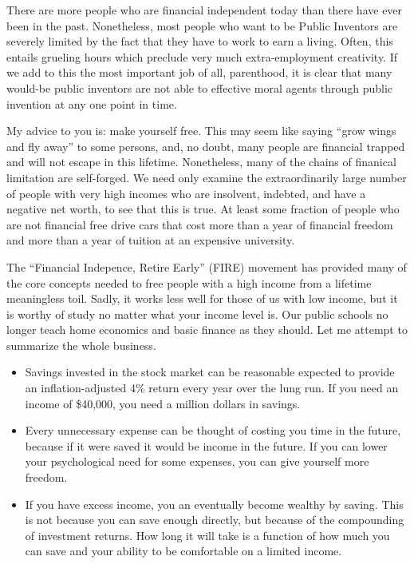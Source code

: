 \documentclass[
	fontsize=10pt, %
	twoside=false, %
	secnumdepth=1, %
]{kaobook}
\begin{document}
There are more people who are financial independent today than there
have ever been in the past. Nonetheless, most people who want to be
Public Inventors are severely limited by the fact that they have to
work to earn a living.
Often, this entails grueling hours which preclude
very much extra-employment creativity. If we add to this the most
important job of all, parenthood, it is clear that many would-be
public inventors are not able to effective moral agents through public
invention at any one point in time.

My advice to you is: make yourself free. This may seem like
saying ``grow wings and fly away'' to some persons, and,
no doubt, many people are financial trapped and will not
escape in this lifetime.
Nonetheless, many of the chains of finanical limitation are
self-forged. We need only examine the extraordinarily large
number of people with very high incomes who are insolvent,
indebted, and have a negative net worth, to see that this is true.
At least some fraction of people who are not financial free
drive cars that cost more than a year of financial freedom and more
than a year of tuition at an expensive university.

The ``Financial Indepence, Retire Early'' (FIRE) movement has
provided many of the core concepts needed to free people with
a high income from a lifetime meaningless toil.
Sadly, it works
less well for those of us with low income, but it is worthy of study
no matter what your income level is.
Our public schools no longer teach home economics and basic
finance as they should. Let me attempt to summarize the whole
business.

\begin{itemize}
\item Savings invested in the stock market can be reasonable expected to provide an inflation-adjusted 4\% return every
  year over the lung run.
If you need an income of \$40,000, you need a million dollars in savings.
\item Every unnecessary expense can be thought of costing you time in
  the future, because if it were saved it would be income in the
  future.
  If you can lower your psychological need for some expenses,
you can give yourself more freedom.
\item If you have excess income, you an eventually become wealthy
  by saving.
  This is not because you can save enough directly, but
  because of the compounding of investment returns.
  How long it will take
is a function of how much you can save and your ability to be
comfortable on a limited income.
\end{itemize}
\end{document}
